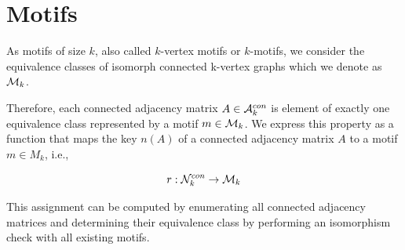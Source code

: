 \documentclass{article}
\newcommand{\eqn}[1]{
	\begin{equation*}
		#1
	\end{equation*}
}
\newcommand{\eqna}[1]{
	\begin{eqnarray*}
		#1
	\end{eqnarray*}
}
\begin{document}










\section{Motifs}

As motifs of size $k$, also called $k$-vertex motifs or $k$-motifs, we consider the equivalence classes of isomorph connected k-vertex graphs which we denote as ${\cal M}_k$.

Therefore, each connected adjacency matrix $A \in {\cal A}_k^{con}$ is element of exactly one equivalence class represented by a motif $m \in {\cal M}_k$.
We express this property as a function that maps the key $n(A)$ of a connected adjacency matrix $A$ to a motif $m \in M_k$, i.e.,

\eqn{r : {\cal N}_k^{con} \rightarrow {\cal M}_k}

This assignment can be computed by enumerating all connected adjacency matrices and determining their equivalence class by performing an isomorphism check with all existing motifs.
\end{document}
